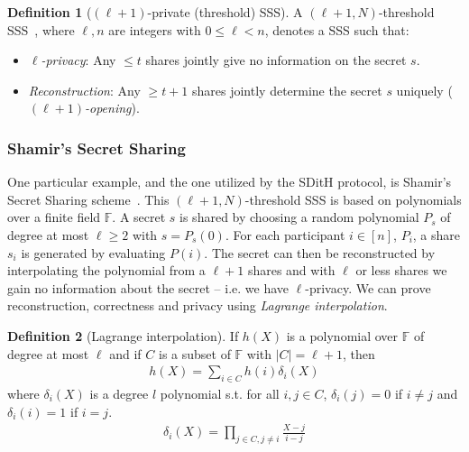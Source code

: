 \documentclass[11pt]{report}
\theoremstyle{definition}
\newtheorem{definition}{Definition}[section]
\theoremstyle{plain}
\begin{document}
\begin{definition}[$(\ell + 1)$-private (threshold) SSS]\label{def:mpc-ss-threshold}
  A $(\ell + 1, N)$-threshold SSS~\cite{cramer2015secure}, where $\ell, n$ are integers with $0 \leq \ell < n$, denotes a SSS such that:
  \begin{itemize}[parsep=0pt, itemsep=0pt]
    \item \textit{$\ell$-privacy}: Any $\leq t$ shares jointly give no information on the secret $s$.
    \item \textit{Reconstruction}: Any $\geq t + 1$ shares jointly determine the secret $s$ uniquely (\textit{$(\ell + 1)$-opening}).
  \end{itemize}
\end{definition}

\subsubsection{Shamir's Secret Sharing}\label{sub:shamir}

One particular example, and the one utilized by the SDitH protocol, is Shamir's Secret Sharing scheme~\cite{shamir1979share,cramer2015secure}. This $(\ell + 1, N)$-threshold SSS is based on polynomials over a finite field $\mathbb{F}$. A secret $s$ is shared by choosing a random polynomial $P_s$ of degree at most $\ell \geq 2$ with $s = P_s(0)$. For each participant $i \in [n]$, $P_i$, a share $s_i$ is generated by evaluating $P(i)$. The secret can then be reconstructed by interpolating the polynomial from a $\ell + 1$ shares and with $\ell$ or less shares we gain no information about the secret -- i.e. we have $\ell$-privacy. We can prove reconstruction, correctness and privacy using \textit{Lagrange interpolation}.

\begin{definition}[Lagrange interpolation]\label{def:lagrange}
  If $h(X)$ is a polynomial over $\mathbb{F}$ of degree at most $\ell$ and if $C$ is a subset of $\mathbb{F}$ with $|C| = \ell + 1$, then
  \begin{align}\label{eq:lagrange1}
    h(X) = \sum_{i\in C}h(i)\delta_i(X)
  \end{align}
  where $\delta_i(X)$ is a degree $l$ polynomial s.t. for all $i,j \in C$, $\delta_i(j) = 0$ if $i \neq j$ and $\delta_i(i) = 1$ if $i = j$.
  \begin{align}\label{eq:lagrange2}
    \delta_i(X) = \prod_{j \in C,j\neq i} \frac{X-j}{i-j}
  \end{align}
\end{definition}
\end{document}
